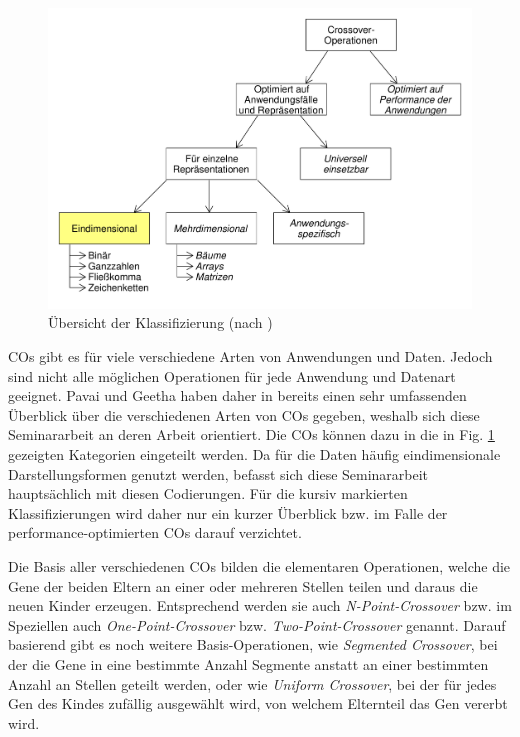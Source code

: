 \documentclass{llncs}
\begin{document}
	\begin{figure}
		\centering
		\includegraphics[width=.8\columnwidth]{./Figures/Crossover-Klassifizierung.pdf}
		\caption{Übersicht der Klassifizierung (nach \cite{Survey})}
		\label{fig:abb2}
	\end{figure}
	
	COs gibt es für viele verschiedene Arten von Anwendungen und Daten. Jedoch sind nicht alle möglichen Operationen für jede Anwendung und Daten\-art ge\-ei\-gnet. Pavai und Geetha haben daher in \cite{Survey} bereits einen sehr umfassenden Überblick über die verschiedenen Arten von COs gegeben, weshalb sich diese Seminararbeit an deren Arbeit orientiert.	Die COs können dazu in die in Fig. \ref{fig:abb2} gezeigten Kategorien eingeteilt werden. Da für die Daten häufig eindimensionale Darstellungsformen genutzt werden, befasst sich diese Seminararbeit hauptsächlich mit diesen Codierungen. Für die kursiv markierten Klassifizierungen wird daher nur ein kurzer Überblick bzw. im Falle der performance-optimierten COs darauf verzichtet.
	
	Die Basis aller verschiedenen COs bilden die elementaren Operationen, wel\-che die Gene der beiden Eltern an einer oder mehreren Stellen teilen und daraus die neuen Kinder erzeugen. Entsprechend werden sie auch \textit{N-Point-Crossover} bzw. im Speziellen auch \textit{One-Point-Crossover} bzw. \textit{Two-Point-Crossover} ge\-nannt. Darauf basierend gibt es noch weitere Basis-Operationen, wie \textit{Segmented Cross\-over}, bei der die Gene in eine bestimmte Anzahl Segmente anstatt an einer bestimmten Anzahl an Stellen geteilt werden, \cite{GABasicIdeas} oder wie \textit{Uniform Crossover}, bei der für jedes Gen des Kindes zufällig ausgewählt wird, von welchem Elternteil das Gen vererbt wird.

\end{document}
